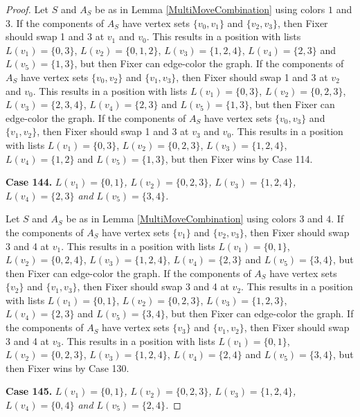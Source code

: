 \documentclass[12pt]{amsart}
\theoremstyle{plain}
\theoremstyle{definition}
\theoremstyle{remark}
\begin{document}
\begin{proof}
Let $S$ and $A_S$ be as in Lemma \ref{MultiMoveCombination} using colors $1$ and $3$. If the components of $A_S$ have vertex sets $\{v_0, v_1\}$ and $\{v_2, v_3\}$, then Fixer should swap 1 and 3 at $v_1$ and $v_0$. This results in a position with lists $L(v_1) = \{0, 3\}$, $L(v_2) = \{0, 1, 2\}$, $L(v_3) = \{1, 2, 4\}$, $L(v_4) = \{2, 3\}$ and $L(v_5) = \{1, 3\}$, but then Fixer can edge-color the graph.
If the components of $A_S$ have vertex sets $\{v_0, v_2\}$ and $\{v_1, v_3\}$, then Fixer should swap 1 and 3 at $v_2$ and $v_0$. This results in a position with lists $L(v_1) = \{0, 3\}$, $L(v_2) = \{0, 2, 3\}$, $L(v_3) = \{2, 3, 4\}$, $L(v_4) = \{2, 3\}$ and $L(v_5) = \{1, 3\}$, but then Fixer can edge-color the graph.
If the components of $A_S$ have vertex sets $\{v_0, v_3\}$ and $\{v_1, v_2\}$, then Fixer should swap 1 and 3 at $v_3$ and $v_0$. This results in a position with lists $L(v_1) = \{0, 3\}$, $L(v_2) = \{0, 2, 3\}$, $L(v_3) = \{1, 2, 4\}$, $L(v_4) = \{1, 2\}$ and $L(v_5) = \{1, 3\}$, but then Fixer wins by Case 114.

\noindent\textbf{Case 144.  }\textit{$L(v_1) = \{0, 1\}$, $L(v_2) = \{0, 2, 3\}$, $L(v_3) = \{1, 2, 4\}$, $L(v_4) = \{2, 3\}$ and $L(v_5) = \{3, 4\}$.}

Let $S$ and $A_S$ be as in Lemma \ref{MultiMoveCombination} using colors $3$ and $4$. If the components of $A_S$ have vertex sets $\{v_1\}$ and $\{v_2, v_3\}$, then Fixer should swap 3 and 4 at $v_1$. This results in a position with lists $L(v_1) = \{0, 1\}$, $L(v_2) = \{0, 2, 4\}$, $L(v_3) = \{1, 2, 4\}$, $L(v_4) = \{2, 3\}$ and $L(v_5) = \{3, 4\}$, but then Fixer can edge-color the graph.
If the components of $A_S$ have vertex sets $\{v_2\}$ and $\{v_1, v_3\}$, then Fixer should swap 3 and 4 at $v_2$. This results in a position with lists $L(v_1) = \{0, 1\}$, $L(v_2) = \{0, 2, 3\}$, $L(v_3) = \{1, 2, 3\}$, $L(v_4) = \{2, 3\}$ and $L(v_5) = \{3, 4\}$, but then Fixer can edge-color the graph.
If the components of $A_S$ have vertex sets $\{v_3\}$ and $\{v_1, v_2\}$, then Fixer should swap 3 and 4 at $v_3$. This results in a position with lists $L(v_1) = \{0, 1\}$, $L(v_2) = \{0, 2, 3\}$, $L(v_3) = \{1, 2, 4\}$, $L(v_4) = \{2, 4\}$ and $L(v_5) = \{3, 4\}$, but then Fixer wins by Case 130.

\noindent\textbf{Case 145.  }\textit{$L(v_1) = \{0, 1\}$, $L(v_2) = \{0, 2, 3\}$, $L(v_3) = \{1, 2, 4\}$, $L(v_4) = \{0, 4\}$ and $L(v_5) = \{2, 4\}$.}


\end{proof}
\end{document}
